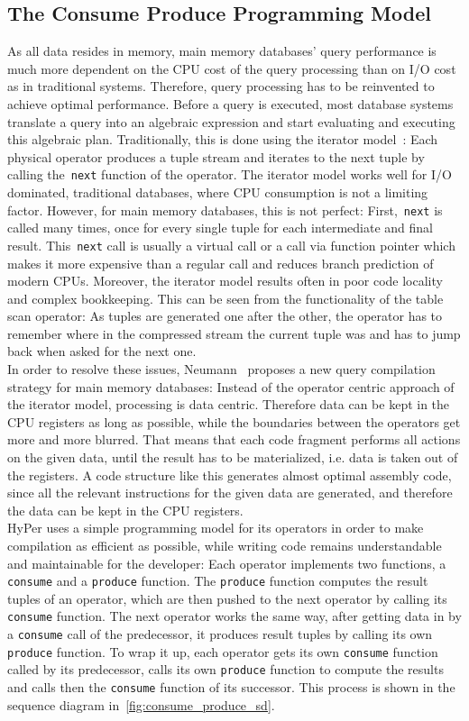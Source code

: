 \subsection{The Consume Produce Programming Model}
As all data resides in memory, main memory databases' query performance is much more dependent on the CPU cost of the query processing than on I/O cost as in traditional systems. Therefore, query processing has to be reinvented to achieve optimal performance.
Before a query is executed, most database systems translate a query into an algebraic expression and start evaluating and executing this algebraic plan. Traditionally, this is done using the iterator model~\parencite{iterator}: Each physical operator produces a tuple stream and iterates to the next tuple by calling the~\texttt{next} function of the operator. The iterator model works well for I/O dominated, traditional databases, where CPU consumption is not a limiting factor. However, for main memory databases, this is not perfect: First,~\texttt{next} is called many times, once for every single tuple for each intermediate and final result. This~\texttt{next} call is usually a virtual call or a call via function pointer which makes it more expensive than a regular call and reduces branch prediction of modern CPUs. Moreover, the iterator model results often in poor code locality and complex bookkeeping. This can be seen from the functionality of the table scan operator: As tuples are generated one after the other, the operator has to remember where in the compressed stream the current tuple was and has to jump back when asked for the next one. 
\\
In order to resolve these issues, Neumann~\parencite{neumann} proposes a new query compilation strategy for main memory databases: Instead of the operator centric approach of the iterator model, processing is data centric. Therefore data can be kept in the CPU registers as long as possible, while the boundaries between the operators get more and more blurred. That means that each code fragment performs all actions on the given data, until the result has to be materialized, i.e. data is taken out of the registers. A code structure like this generates almost optimal assembly code, since all the relevant instructions for the given data are generated, and therefore the data can be kept in the CPU registers.
\\
HyPer uses a simple programming model for its operators in order to make  compilation as efficient as possible, while writing code remains understandable and maintainable for the developer: Each operator implements two functions, a \texttt{consume} and a \texttt{produce} function. The \texttt{produce} function computes the result tuples of an operator, which are then pushed to the next operator by calling its \texttt{consume} function. The next operator works the same way, after getting data in by a \texttt{consume} call of the predecessor, it produces result tuples by calling its own \texttt{produce} function. To wrap it up, each operator gets its own \texttt{consume} function called by its predecessor, calls its own \texttt{produce} function to compute the results and calls then the \texttt{consume} function of its successor. This process is shown in the sequence diagram in~\autoref{fig:consume_produce_sd}.


